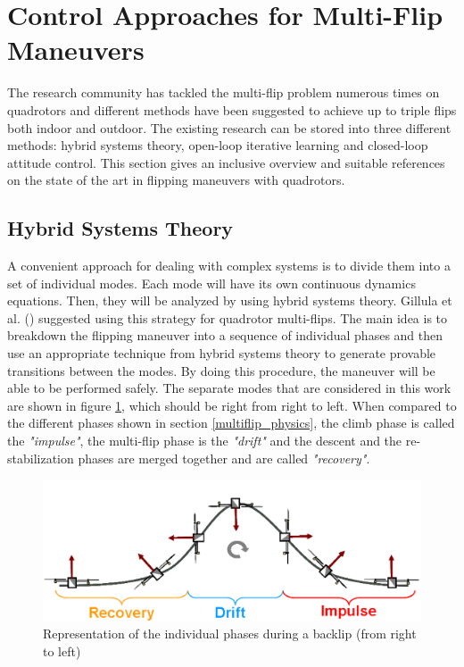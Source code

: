 \documentclass{thesisreport}
\begin{document}
\newpage

 \section{Control Approaches for Multi-Flip Maneuvers}
 
The research community has tackled the multi-flip problem numerous times on quadrotors and different methods have been suggested to achieve up to triple flips both indoor and outdoor. The existing research can be stored into three different methods: hybrid systems theory, open-loop iterative learning and closed-loop attitude control. This section gives an inclusive overview and suitable references on the state of the art in flipping maneuvers with quadrotors.
  
 \subsection{Hybrid Systems Theory}
 
A convenient approach for dealing with complex systems is to divide them into a set of individual modes. Each mode will have its own continuous dynamics equations. Then, they will be analyzed by using hybrid systems theory. Gillula et al. (\cite{Gillula2011,Gillula2010}) suggested using this strategy for quadrotor multi-flips. The main idea is to breakdown the flipping maneuver into a sequence of individual phases and then use an appropriate technique from hybrid systems theory to generate provable transitions between the modes. By doing this procedure, the maneuver will be able to be performed safely. The separate modes that are considered in this work are shown in figure \ref{hybrid_systems_theory_figure}, which should be right from right to left. When compared to the different phases shown in section \ref{multiflip_physics}, the climb phase is called the \textit{"impulse"}, the multi-flip phase is the \textit{"drift"} and the descent and the re-stabilization phases are merged together and are called \textit{"recovery"}.
 
 \begin{figure}[h]
 \centering
 \includegraphics[width=\textwidth]{Images/Flip/Hybrid_Systems_Theory}
 \caption{Representation of the individual phases during a backlip (from right to left)\cite{Gillula2011}}
 \label{hybrid_systems_theory_figure}
 \end{figure}
\end{document}
